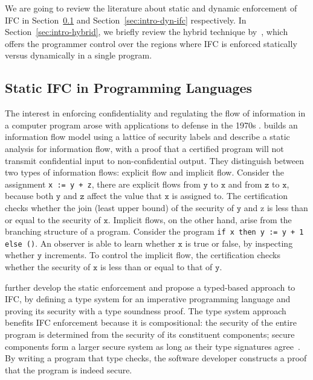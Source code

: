 \documentclass[10pt, letterpaper]{article}
\newcommand{\key}[1]{\ensuremath{\mathtt{#1}}}
\begin{document}
We are going to review the literature about static and dynamic enforcement of
IFC in Section~\ref{sec:intro-static-ifc} and Section~\ref{sec:intro-dyn-ifc}
respectively. In Section~\ref{sec:intro-hybrid}, we briefly review the hybrid
technique by~\citet{Buiras:2015aa}, which offers the programmer control over the
regions where IFC is enforced statically versus dynamically in a single program.

\subsection{Static IFC in Programming Languages}
\label{sec:intro-static-ifc}

The interest in enforcing confidentiality and regulating the flow of information
in a computer program arose with applications to defense in the 1970s
\citep{bell1976secure}. \citet{denning1976lattice} builds an information
flow model using a lattice of security labels and
\citet{denning1977certification} describe a static analysis for information
flow, with a proof that a certified program will not transmit confidential input
to non-confidential output. They distinguish between two types of information
flows: explicit flow and implicit flow. Consider the assignment \texttt{x := y +
  z}, there are explicit flows from \key{y} to \key{x} and from \key{z} to
\key{x}, because both \key{y} and \key{z} affect the value that \key{x} is
assigned to. The certification checks whether the join (least upper bound) of
the security of \key{y} and {z} is less than or equal to the security of
\key{x}. Implicit flows, on the other hand, arise from the branching structure
of a program. Consider the program \texttt{if x then y := y + 1 else ()}. An
observer is able to learn whether \key{x} is true or false, by inspecting
whether \key{y} increments. To control the implicit flow, the certification
checks whether the security of \key{x} is less than or equal to that of \key{y}.

\citet{volpano1996sound} further develop the static enforcement and propose a
typed-based approach to IFC, by defining a type system for an imperative
programming language and proving its security with a type soundness proof. The
type system approach benefits IFC enforcement because it is compositional: the
security of the entire program is determined from the security of its
constituent components; secure components form a larger secure system as long as
their type signatures agree~\cite{sabelfeld2003language}. By writing a program
that type checks, the software developer constructs a proof that the program is
indeed secure.
\end{document}
